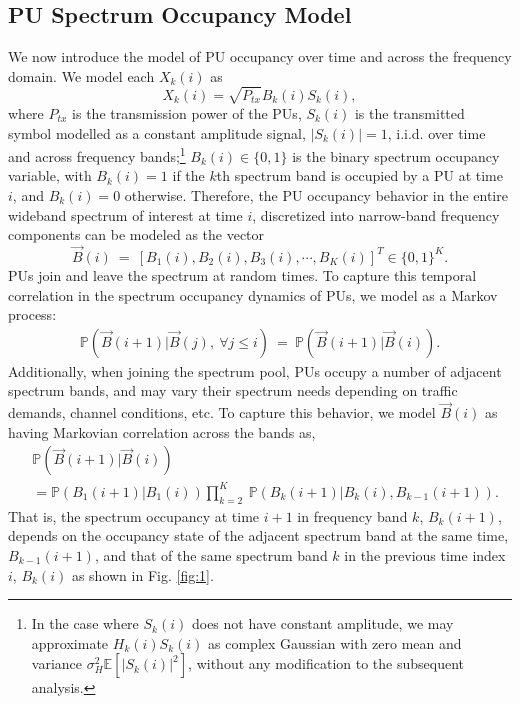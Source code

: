 \documentclass[10pt,twocolumn]{IEEEtran}
\newcommand{\sst}[1]{}
\newcommand{\add}[1]{{\color{red}{#1}}}
\begin{document}
\subsection{PU Spectrum Occupancy Model}
We now introduce the model of PU occupancy over time and across the frequency domain. We model each $X_k(i)$ as 
\begin{equation}\label{4}
    X_k(i)=\sqrt{P_{tx}}B_k(i)S_k(i),
\end{equation}
where $P_{tx}$ is the transmission power of the PUs, $S_k(i)$ is the transmitted symbol modelled as a constant amplitude signal, $|S_k(i)|{=}1$, i.i.d. over time and across frequency bands;\footnote{In the case where $S_k(i)$ does not have constant amplitude, we may approximate $H_{k}(i)S_{k}(i)$ as complex Gaussian with zero mean and variance $\sigma_H^2\mathbb E[|S_{k}(i)|^2]$, without any modification to the subsequent analysis.} $B_k(i){\in}\{0,1\}$ is the binary spectrum occupancy variable, with $B_k(i){=}1$ if the $k$th spectrum band is occupied by a PU at time $i$, and $B_k(i){=}0$ otherwise. Therefore, the PU occupancy behavior in the entire wideband spectrum of interest at time $i$, discretized into narrow-band frequency components can be modeled as the vector 
\begin{equation}\label{5}
    \vec{B}(i)\ =\ [B_1(i),B_2(i),B_3(i),\cdots,B_K(i)]^T \in \{0,1\}^K.
\end{equation}
PUs join and leave the spectrum at random times. To capture this temporal correlation in the spectrum occupancy dynamics of PUs, we model \add{$\vec{B}(i)$}\sst{ the spectrum occupancy dynamics} as a Markov process:\sst{ given $\vec{B}(i)$, the spectrum occupancy state at time index $i$, $\vec{B}(i+1)$ is independent of the past, $\vec{B}(j), j < i$; $j, i \in \{1,2,3,\dots,T\}$, i.e. }
\begin{equation}\label{6}
    \begin{aligned}
        \mathbb{P}(\vec{B}(i+1)|\vec{B}(j),\ \forall j \leq i)\ =\ \mathbb{P}(\vec{B}(i+1)|\vec{B}(i)).
    \end{aligned}
\end{equation}
Additionally, when joining the spectrum pool, PUs occupy a number of adjacent spectrum bands, and may vary their spectrum needs depending on traffic demands, channel conditions, etc. To capture this behavior, we model $\vec{B}(i)$ as having Markovian correlation across the bands as, 
\begin{align}\label{7}
&         \mathbb{P}(\vec{B}(i+1)|\vec{B}(i))\\&=
\nonumber
         \mathbb{P}(B_{1}(i+1)|B_{1}(i))
         \prod_{k=2}^{K}\ \mathbb{P}(B_{k}(i+1)|B_{k}(i),B_{k-1}(i+1)).
\end{align}
That is, the spectrum occupancy at time $i+1$ in frequency band $k$, $B_{k}(i+1)$, depends on the  occupancy state of the adjacent spectrum band at the same time, $B_{k-1}(i+1)$, and that of the same spectrum band $k$ in the previous time index $i$, $B_{k}(i)$ as shown in Fig. \ref{fig:1}.
\end{document}
